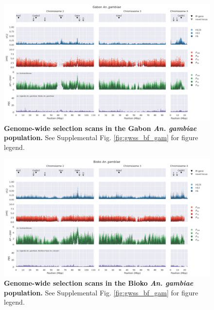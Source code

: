 \documentclass[a4paper,11pt,abstracton,hidelinks]{scrartcl}
\begin{document}
\begin{landscape}
\begin{figure}[t!]
	\begin{center}
		\includegraphics*[width=1\linewidth,center]{artwork/gwss_ga_gam_gw_ug_gam_gq_gam.png}
	\end{center}
	\caption{
	\textbf{Genome-wide selection scans in the Gabon \textit{An. gambiae} population.} 
	See Supplemental Fig. \ref{fig:gwss_bf_gam} for figure legend.
	} 
	\label{fig:gwss_ga_gam}
\end{figure}


\begin{figure}[t!]
	\begin{center}
		\includegraphics*[width=1\linewidth,center]{artwork/gwss_gq_gam_gw_ug_gam_bf_col.png}
	\end{center}
	\caption{
	\textbf{Genome-wide selection scans in the Bioko \textit{An. gambiae} population.} 
	See Supplemental Fig. \ref{fig:gwss_bf_gam} for figure legend.
	} 
	\label{fig:gwss_gq_gam}
\end{figure}



\end{landscape}
\end{document}
